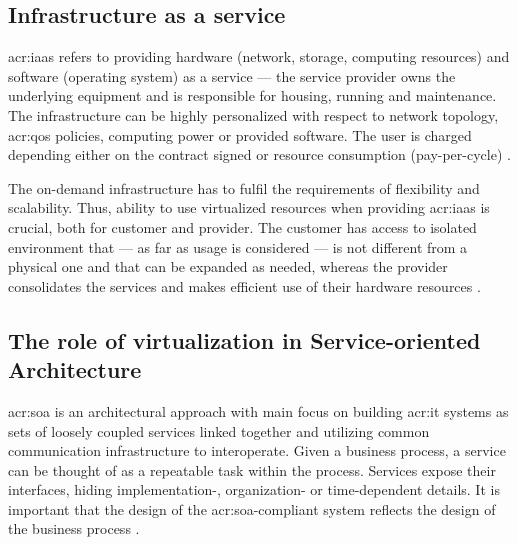 \documentclass[11pt]{book}
\begin{document}
      \subsection{Infrastructure as a service}

        \gls{acr:iaas} refers to providing hardware (network, storage, computing resources) and software (operating
        system) as a service --- the service provider owns the underlying equipment and is responsible for housing,
        running and maintenance. The infrastructure can be highly personalized with respect to network topology,
        \gls{acr:qos} policies, computing power or provided software. The user is charged depending either on the
        contract signed or resource consumption (pay-per-cycle) \cite{iaas}.

        The on-demand infrastructure has to fulfil the requirements of flexibility and scalability. Thus, ability to use
        virtualized resources when providing \gls{acr:iaas} is crucial, both for customer and provider. The customer has
        access to isolated environment that --- as far as usage is considered --- is not different from a physical one
        and that can be expanded as needed, whereas the provider consolidates the services and makes efficient use of
        their hardware resources \cite{iaas}.




      \subsection{The role of virtualization in Service-oriented Architecture}

        \gls{acr:soa} is an architectural approach with main focus on building \gls{acr:it} systems as sets of loosely
        coupled services linked together and utilizing common communication infrastructure to interoperate. Given a
        business process, a service can be thought of as a repeatable task within the process. Services expose their
        interfaces, hiding implementation-, organization- or time-dependent details. It is important that the design of
        the \gls{acr:soa}-compliant system reflects the design of the business process \cite{soa-foundation}.
\end{document}
